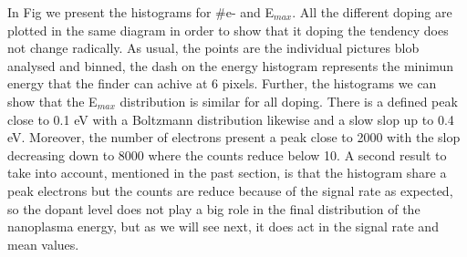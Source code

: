 In Fig\label{ref:XeCahisto} we present the histograms for $\#$e- and E$_{max}$. All the different doping are plotted in the same diagram in order to show that it doping the tendency does not change radically. As usual, the points are the individual pictures blob analysed and binned, the dash on the energy histogram represents the minimun energy that the finder can achive at 6 pixels. Further, the histograms we can show that the E$_{max}$ distribution is similar for all doping.  There is a defined peak close to 0.1 eV with a Boltzmann distribution likewise and a slow slop up to 0.4 eV. Moreover, the number of electrons present a peak close to 2000 with the slop decreasing down to 8000 where the counts reduce below 10. A second result to take into account, mentioned in the past section, is that the histogram share a peak electrons but the counts are reduce because of the signal rate as expected, so the dopant level does not play a big role in  the final distribution of the nanoplasma energy, but as we will see next, it does act in the signal rate and mean values.

